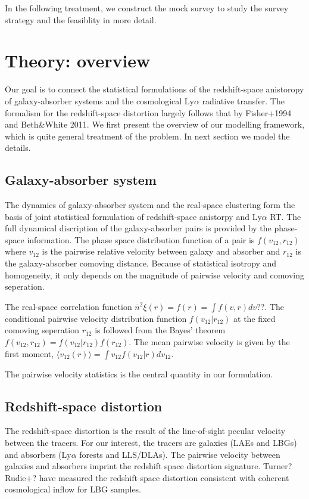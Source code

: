 \documentclass[useAMS,usenatbib,twocolumn]{mn2e}
\newcommand{\LyA}{\mbox{Ly}\alpha}
\begin{document}
In the following treatment, we construct the mock survey to study the 
survey strategy and the feasiblity in more detail.


\section{Theory: overview}
Our goal is to connect the statistical formulations of the redshift-space 
anistoropy of galaxy-absorber systems and the cosmological $\LyA$ radiative 
transfer. The formalism for the redshift-space distortion largely follows
that by Fisher+1994 and Beth\&White 2011. We first present the overview of
our modelling framework, which is quite general treatment of the problem.
In next section we model the details.

\subsection{Galaxy-absorber system}
The dynamics of galaxy-absorber system and the real-space clustering form the
basis of joint statistical formulation of redshift-space anistorpy and 
$\LyA$ RT. The full dynamical discription of the galaxy-absorber pairs
is provided by the phase-space information. The phase space distribution 
function of a pair is $f(v_{12},r_{12})$ where $v_{12}$ is
the pairwise relative velocity between galaxy and absorber and $r_{12}$ is
the galaxy-absorber comoving distance. Because of statistical isotropy and
homogeneity, it only depends on the magnitude of pairwise velocity and
comoving seperation. 

The real-space correlation function $\bar{n}^2\xi(r)=f(r)=\int f(v,r)dv$??.
The conditional pairwise velocity distribution function $f(v_{12}|r_{12})$
at the fixed comoving seperation $r_{12}$ is followed from the Bayes' theorem
$f(v_{12},r_{12})=f(v_{12}|r_{12})f(r_{12})$. The mean pairwise velocity is
given by the first moment, $\langle v_{12}(r)\rangle=\int v_{12}f(v_{12}|r)
dv_{12}$.

The pairwise velocity statistics is the central quantity in our formulation.

\subsection{Redshift-space distortion}
The redshift-space distortion is the result of the line-of-sight pecular 
velocity between the tracers. For our interest, the tracers are galaxies 
(LAEs and LBGs) and absorbers ($\LyA$ forests and LLS/DLAs). 
The pairwise velocity between galaxies and absorbers imprint the redshift space
distortion signature. Turner? Rudie+? have measured the redshift space 
distortion consistent with coherent cosmological inflow for LBG samples. 
\end{document}
